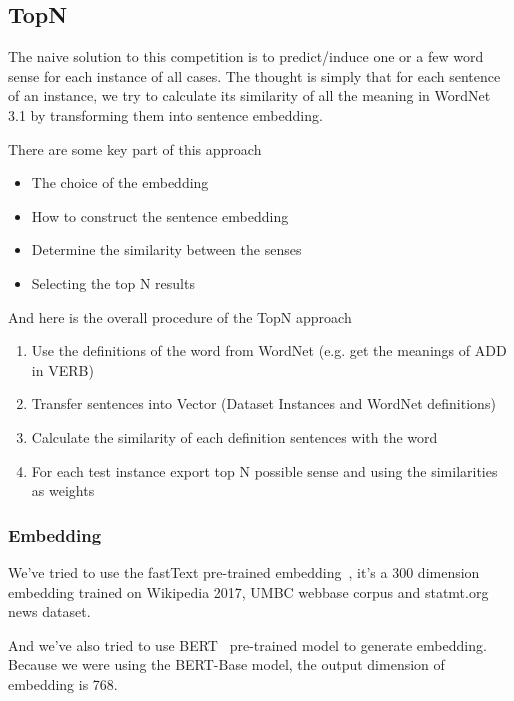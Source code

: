\subsection{TopN}
\label{sec:topn}

The naive solution to this competition is to predict/induce one or a few word sense for each instance of all cases. The thought is simply that for each sentence of an instance, we try to calculate its similarity of all the meaning in WordNet 3.1 by transforming them into sentence embedding.

There are some key part of this approach

\begin{itemize}
    \item The choice of the embedding
    \item How to construct the sentence embedding
    \item Determine the similarity between the senses
    \item Selecting the top N results
\end{itemize}

And here is the overall procedure of the TopN approach

\begin{enumerate}
    \item Use the definitions of the word from WordNet (e.g. get the meanings of ADD in VERB)
    \item Transfer sentences into Vector (Dataset Instances and WordNet definitions)
    \item Calculate the similarity of each definition sentences with the word
    \item For each test instance export top N possible sense and using the similarities as weights
\end{enumerate}

\subsubsection*{Embedding}
\label{sec:embedding}

We've tried to use the fastText pre-trained embedding~\cite{mikolov2018advances}, it's a 300 dimension embedding trained on Wikipedia 2017, UMBC webbase corpus and statmt.org news dataset.

And we've also tried to use BERT~\cite{devlin2018bert} pre-trained model to generate embedding. Because we were using the BERT-Base model, the output dimension of embedding is 768.

